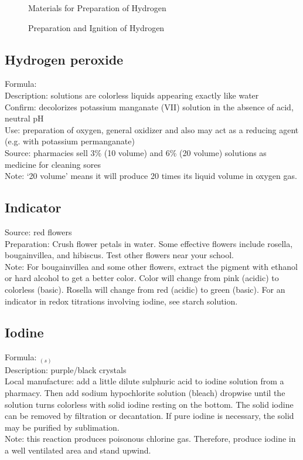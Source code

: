 \begin{figure}[h]
\begin{center}
\def\svgwidth{250pt}

\caption{Materials for Preparation of Hydrogen}
\end{center}
\end{figure}

\begin{figure}[h]
\begin{center}
\def\svgwidth{300pt}

\caption{Preparation and Ignition of Hydrogen}
\end{center}
\end{figure}

\subsection{Hydrogen peroxide}
Formula: \\
Description: solutions are colorless liquids 
appearing exactly like water\\
Confirm: decolorizes potassium manganate (VII) solution 
in the absence of acid, 
neutral pH\\
Use: preparation of oxygen, 
general oxidizer and also may act as a reducing agent (e.g. 
with potassium permanganate)\\
Source: pharmacies sell 3\% (10 volume) and 6\% (20 volume) solutions 
as medicine for cleaning sores\\
Note: `20 volume' means it will produce 20 times its liquid volume in oxygen gas.
\subsection{Indicator}
\label{sec:indicator}
Source: red flowers\\
Preparation: Crush flower petals in water. 
Some effective flowers include rosella, 
bougainvillea, 
and hibiscus. 
Test other flowers near your school.\\
Note: For bougainvillea and some other flowers, 
extract the pigment with ethanol 
or hard alcohol to get a better color. 
Color will change from pink (acidic) to colorless (basic). 
Rosella will change from red (acidic) to green (basic).
For an indicator in redox titrations involving iodine, 
see starch solution.
\subsection{Iodine}
Formula: $_{(s)}$\\
Description: purple/black crystals\\
Local manufacture: add a little dilute sulphuric acid 
to iodine solution from a pharmacy. 
Then add sodium hypochlorite solution (bleach) dropwise 
until the solution turns colorless with solid iodine resting on the bottom. 
The solid iodine can be removed by filtration or decantation. 
If pure iodine is necessary, 
the solid may be purified by sublimation.\\
Note: this reaction produces poisonous chlorine gas. 
Therefore, 
produce iodine in a well ventilated area and stand upwind.
